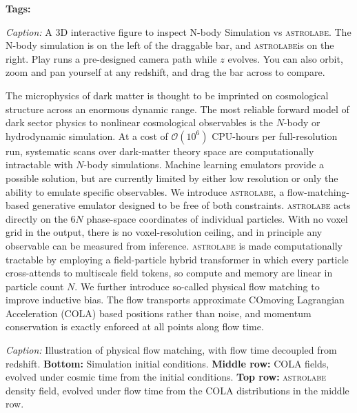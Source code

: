 \documentclass[11pt]{article}
\newcommand{\astrolabe}{\textsc{astrolabe}}
\newcommand{\interactive}[3][]{%
  \begin{tcolorbox}[colback=orange!5,colframe=orange!60!black,
                    title={Interactive: \texttt{#2}\ifx\relax#1\relax\else\ (#1)\fi}]
  \emph{Caption:} #3
  \end{tcolorbox}}
\newcommand{\figplace}[3][]{%
  \begin{tcolorbox}[colback=blue!4,colframe=blue!40!black,
                    title={Figure: \texttt{#2}\ifx\relax#1\relax\else\ (#1)\fi}]
  \emph{Caption:} #3
  \end{tcolorbox}}
\begin{document}
\maketitle
\noindent\textbf{Tags:} \theposttags


\noindent\textit{\thepostbyline}\par\medskip


\interactive{astro3d}{A 3D interactive figure to inspect N-body Simulation vs \astrolabe. The N-body simulation is on the left of the draggable bar, and \astrolabe is on the right. 
Play runs a pre-designed camera path while $z$ evolves. You can also orbit, zoom and pan yourself at any redshift, and drag the bar across to compare.}

The microphysics of dark matter is thought to be imprinted on cosmological structure across an enormous dynamic range. The most reliable forward model of dark
sector physics to nonlinear cosmological observables is the $N$-body or hydrodynamic simulation. At a cost of $\mathcal{O}(10^6)$ CPU-hours per full-resolution run, systematic scans over dark-matter theory space are computationally intractable with $N$-body simulations. Machine learning emulators provide a possible solution, but are currently limited by either low resolution or only the ability to emulate specific observables. We introduce \astrolabe{}, a flow-matching-based generative emulator designed to be free of both constraints. \astrolabe{} acts directly on the $6N$ phase-space coordinates of individual particles. With no voxel grid in the output, there is no voxel-resolution ceiling, and in principle any observable can be measured from inference. \astrolabe{} is made computationally tractable by employing a field-particle hybrid transformer in which every particle cross-attends to multiscale field tokens, so compute and memory are linear in particle count $N$. We further introduce so-called physical flow matching to improve inductive bias. The flow transports approximate COmoving Lagrangian Acceleration (COLA) \cite{Tassev:2013pn} based positions rather than noise, and momentum conservation is exactly enforced at all points along flow time.

\figplace[medium]{fig-flowtime-decoupled}{Illustration of physical flow
matching, with flow time decoupled from redshift. \textbf{Bottom:} Simulation
initial conditions. \textbf{Middle row:} COLA fields, evolved under cosmic time
from the initial conditions. \textbf{Top row:} \astrolabe{} density field,
evolved under flow time from the COLA distributions in the middle row.}
\end{document}
